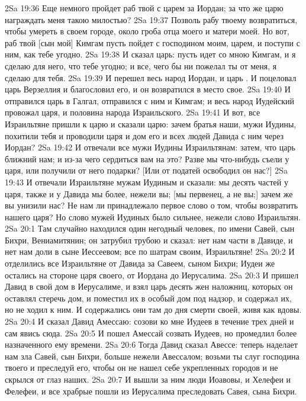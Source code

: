 \vs 2Sa 19:36 Еще немного пройдет раб твой с царем за Иордан; за что же царю награждать меня такою милостью?
\vs 2Sa 19:37 Позволь рабу твоему возвратиться, чтобы умереть в своем городе, около гроба отца моего и матери моей. Но вот, раб твой [сын мой] Кимгам пусть пойдет с господином моим, царем, и поступи с ним, как тебе угодно.
\vs 2Sa 19:38 И сказал царь: пусть идет со мною Кимгам, и я сделаю для него, что тебе угодно; и все, чего бы ни пожелал ты от меня, я сделаю для тебя.
\vs 2Sa 19:39 И перешел весь народ Иордан, и царь . И поцеловал царь Верзеллия и благословил его, и он возвратился в место свое.
\vs 2Sa 19:40 И отправился царь в Галгал, отправился с ним и Кимгам; и весь народ Иудейский провожал царя, и половина народа Израильского.
\vs 2Sa 19:41 И вот, все Израильтяне пришли к царю и сказали царю: зачем братья наши, мужи Иудины, похитили тебя и проводили царя и дом его и всех людей Давида с ним через Иордан?
\vs 2Sa 19:42 И отвечали все мужи Иудины Израильтянам: затем, что царь ближний нам; и из-за чего сердиться вам на это? Разве мы что-нибудь съели у царя, или получили от него подарки? [Или от податей освободил он нас?]
\vs 2Sa 19:43 И отвечали Израильтяне мужам Иудиным и сказали: мы десять частей у царя, также и у Давида мы более, нежели вы; [мы первенец, а не вы;] зачем же вы унизили нас? Не нам ли принадлежало первое слово о том, чтобы возвратить нашего царя? Но слово мужей Иудиных было сильнее, нежели слово Израильтян.
\vs 2Sa 20:1 Там случайно находился один негодный человек, по имени Савей, сын Бихри, Вениамитянин; он затрубил трубою и сказал: нет нам части в Давиде, и нет нам доли в сыне Иессеевом; все по шатрам своим, Израильтяне!
\vs 2Sa 20:2 И отделились все Израильтяне от Давида  за Савеем, сыном Бихри; Иудеи же остались на стороне царя своего, от Иордана до Иерусалима.
\vs 2Sa 20:3 И пришел Давид в свой дом в Иерусалиме, и взял царь десять жен наложниц, которых он оставлял стеречь дом, и поместил их в особый дом под надзор, и содержал их, но не ходил к ним. И содержались они там до дня смерти своей, живя как вдовы.
\vs 2Sa 20:4 И сказал Давид Амессаю: созови ко мне Иудеев в течение трех дней и сам явись сюда.
\vs 2Sa 20:5 И пошел Амессай созвать Иудеев, но промедлил более назначенного ему времени.
\vs 2Sa 20:6 Тогда Давид сказал Авессе: теперь наделает нам зла Савей, сын Бихри, больше нежели Авессалом; возьми ты слуг господина твоего и преследуй его, чтобы он не нашел себе укрепленных городов и не скрылся от глаз наших.
\vs 2Sa 20:7 И вышли за ним люди Иоавовы, и Хелефеи и Фелефеи, и все храбрые пошли из Иерусалима преследовать Савея, сына Бихри.
